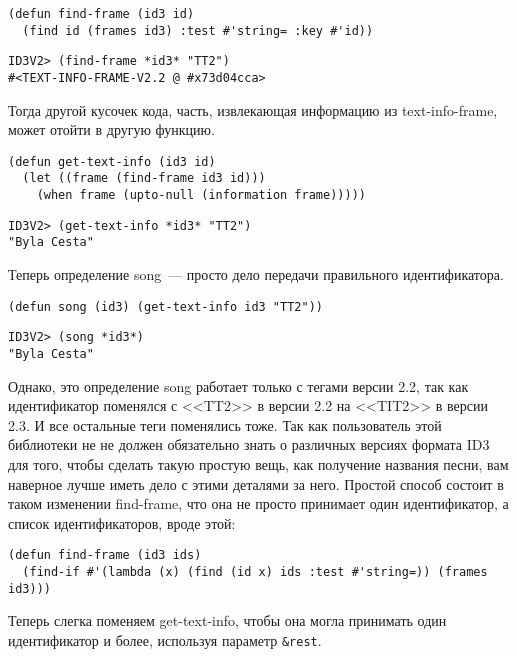 \begin{lstlisting}
(defun find-frame (id3 id)
  (find id (frames id3) :test #'string= :key #'id))
\end{lstlisting}

\begin{lstlisting}
ID3V2> (find-frame *id3* "TT2")
#<TEXT-INFO-FRAME-V2.2 @ #x73d04cca>
\end{lstlisting}

Тогда другой кусочек кода, часть, извлекающая информацию из text-info-frame, может отойти
в другую функцию.

\begin{lstlisting}
(defun get-text-info (id3 id)
  (let ((frame (find-frame id3 id)))
    (when frame (upto-null (information frame)))))
\end{lstlisting}

\begin{lstlisting}
ID3V2> (get-text-info *id3* "TT2")
"Byla Cesta"
\end{lstlisting}

Теперь определение song~--- просто дело передачи правильного идентификатора.

\begin{lstlisting}
(defun song (id3) (get-text-info id3 "TT2"))
\end{lstlisting}

\begin{lstlisting}
ID3V2> (song *id3*)
"Byla Cesta"
\end{lstlisting}

Однако, это определение song работает только с тегами версии 2.2, так как идентификатор
поменялся с <<TT2>> в версии 2.2 на <<TIT2>> в версии 2.3. И все остальные теги поменялись
тоже. Так как пользователь этой библиотеки не не должен обязательно знать о различных
версиях формата ID3 для того, чтобы сделать такую простую вещь, как получение названия
песни, вам наверное лучше иметь дело с этими деталями за него. Простой способ состоит в
таком изменении find-frame, что она не просто принимает один идентификатор, а список
идентификаторов, вроде этой:

\begin{lstlisting}
(defun find-frame (id3 ids)
  (find-if #'(lambda (x) (find (id x) ids :test #'string=)) (frames id3)))
\end{lstlisting}

Теперь слегка поменяем get-text-info, чтобы она могла принимать один идентификатор и
более, используя параметр \lstinline!&rest!.

